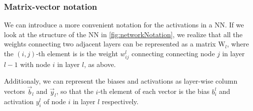 \documentclass[twoside,english]{uiofysmaster}
\begin{document}
\subsubsection{Matrix-vector notation}
We can introduce a more convenient notation for the activations in a NN. 
If we look at the structure of the NN in \autoref{fig:networkNotation}, we realize that all the weights connecting 
two adjacent layers can be represented as a matrix $\mathrm{W}_l$, where the $(i,j)$-th element is 
is the weight $w^l_{ij}$ connecting connecting node $j$
in layer $l-1$ with node $i$ in layer $l$, as above. 

Additionaly, we can represent the biases and activations
as layer-wise column vectors $\vec{b}_l$ and $\vec{y}_l$, so that the $i$-th element of each vector 
is the bias $b_i^l$ and activation $y_i^l$ of node $i$ in layer $l$ respectively. 
\end{document}
